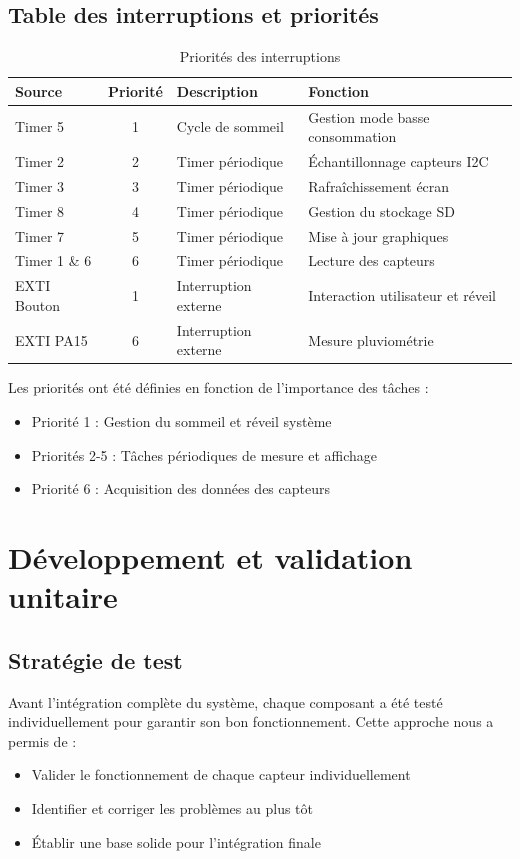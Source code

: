 \documentclass[12pt]{article}
\begin{document}
\subsection{Table des interruptions et priorités}
\begin{table}[H]
\centering
\caption{Priorités des interruptions}
\begin{tabular}{|l|c|l|l|}
\hline
\textbf{Source} & \textbf{Priorité} & \textbf{Description} & \textbf{Fonction} \\
\hline
Timer 5 & 1 & Cycle de sommeil & Gestion mode basse consommation \\
\hline
Timer 2 & 2 & Timer périodique & Échantillonnage capteurs I2C \\
\hline
Timer 3 & 3 & Timer périodique & Rafraîchissement écran \\
\hline
Timer 8 & 4 & Timer périodique & Gestion du stockage SD \\
\hline
Timer 7 & 5 & Timer périodique & Mise à jour graphiques \\
\hline
Timer 1 \& 6 & 6 & Timer périodique & Lecture des capteurs \\
\hline
EXTI Bouton & 1 & Interruption externe & Interaction utilisateur et réveil \\
\hline
EXTI PA15 & 6 & Interruption externe & Mesure pluviométrie \\
\hline
\end{tabular}
\end{table}

Les priorités ont été définies en fonction de l'importance des tâches :
\begin{itemize}
    \item Priorité 1 : Gestion du sommeil et réveil système
    \item Priorités 2-5 : Tâches périodiques de mesure et affichage
    \item Priorité 6 : Acquisition des données des capteurs
\end{itemize}


\section{Développement et validation unitaire}

\subsection{Stratégie de test}
Avant l'intégration complète du système, chaque composant a été testé individuellement pour garantir son bon fonctionnement. Cette approche nous a permis de :
\begin{itemize}
    \item Valider le fonctionnement de chaque capteur individuellement
    \item Identifier et corriger les problèmes au plus tôt
    \item Établir une base solide pour l'intégration finale
\end{itemize}
\end{document}

